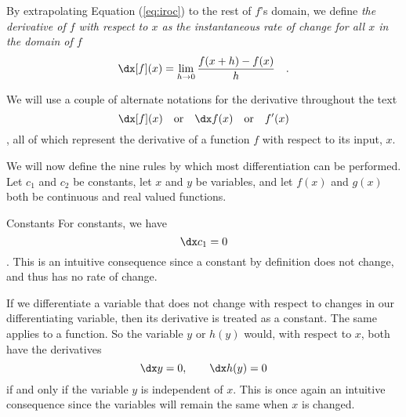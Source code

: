 By extrapolating Equation (\ref{eq:iroc}) to the rest of $f$'s domain, we define \emph{the derivative of $f$ with respect to $x$ as the
instantaneous rate of change for all $x$ in the domain of $f$}
\begin{equation}\label{eq:derivative}
    \dx[f] (x) = \lim_{h\rightarrow 0} \frac{f(x + h) - f(x)}{h} \quad .
\end{equation}

We will use a couple of alternate notations for the derivative
throughout the text
\begin{equation*}
    \dx[f](x) \quad \text{or} \quad \dx f(x) \quad \text{or} \quad f'(x)
\end{equation*}, all of which represent the derivative of a function $f$ with respect to its input, $x$.



We will now define the nine rules by which most differentiation can be performed. Let $c_1$ and $c_2$ be constants, let $x$ and $y$ be variables, and let $f(x)$ and $g(x)$ both be continuous and real valued functions.

\begin{psec}{Constants}\label{rule:derivative constants} For constants,
    we have
    \begin{equation}\label{eq:derivative constant}
        \dx c_1 = 0
    \end{equation}
    . This is an intuitive consequence since a constant by definition does not
    change, and thus has no rate of change.

    If we differentiate a variable that does not change with respect to changes in our differentiating variable, then its derivative is treated as a constant. The same applies to a function. So the variable $y$ or $h(y)$ would, with respect to $x$, both have the derivatives
    \begin{equation*}
        \dx y = 0, \quad \quad \dx h(y) = 0
    \end{equation*} if and only if the variable $y$ is independent of $x$. This is once again an intuitive consequence since the variables will remain the same when $x$ is changed.

\end{psec}

